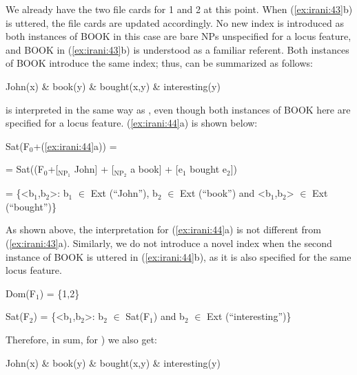 \documentclass[output=paper,
modfonts
]{langscibook}
\begin{document}
We already have the two file cards for 1 and 2 at this point. When (\ref{ex:irani:43}b) is uttered, the file cards are updated accordingly. No new index is introduced as both instances of BOOK in this case are bare NPs unspecified for a locus feature, and BOOK in (\ref{ex:irani:43}b) is understood as a familiar referent. Both instances of BOOK introduce the same index; thus,  can be summarized as follows: 

\begin{exe}
\ex John(x) \& book(y) \& bought(x,y) \& interesting(y)
\end{exe}


 is interpreted in the same way as , even though both instances of BOOK here are specified for a locus feature. (\ref{ex:irani:44}a) is shown below:

\begin{exe}
  
\ex Sat(F$_0$+(\ref{ex:irani:44}a)) = \par 
= Sat((F$_0$+[$_{\text{NP}_{1}}$ John] + [$_{\text{NP}_{2}}$ a book] + [e$_1$ bought e$_2$])\par 
= \{<b$_1$,b$_2$>: b$_1$ \(\in\) Ext (``John''), b$_2$ \(\in\) Ext (``book'') and <b$_1$,b$_2$> \(\in\) Ext (``bought'')\} \par 

\end{exe}


As shown above, the interpretation for (\ref{ex:irani:44}a) is not different from (\ref{ex:irani:43}a). Similarly, we do not introduce a novel index when the second instance of BOOK is uttered in (\ref{ex:irani:44}b), as it is also specified for the same locus feature.  

\begin{exe}

\ex Dom(F$_1$) = \{1,2\} \par 
Sat(F$_2$) = \{<b$_1$,b$_2$>: b$_2$ \(\in\) Sat(F$_1$) and b$_2$ \(\in\) Ext (``interesting'')\} \par 

\end{exe}

Therefore, in sum, for ) we also get: 

\begin{exe}

\ex John(x) \& book(y) \& bought(x,y) \& interesting(y)

\end{exe}
\end{document}
